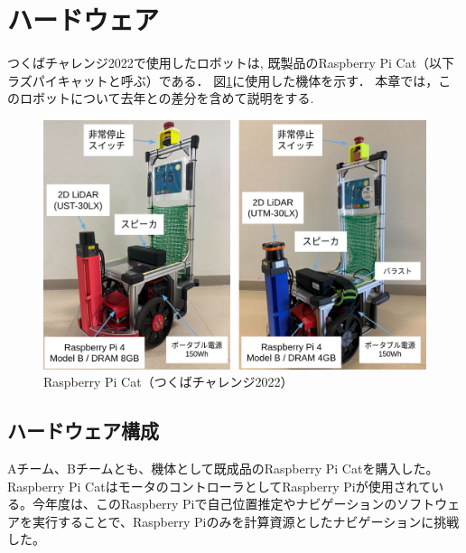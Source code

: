 \documentclass[twocolumn,9pt]{jsproceedings}
\begin{document}

\section{ハードウェア}

つくばチャレンジ2022で使用したロボットは, 
既製品のRaspberry Pi Cat（以下ラズパイキャットと呼ぶ）\cite{RTshop}である．
図\ref{fig:raspicat}に使用した機体を示す．
本章では，このロボットについて去年との差分を含めて説明をする.

\begin{figure}[h]
	\begin{center}
		\includegraphics[width=1.0\linewidth]{figs/raspicat.pdf}
		\caption{Raspberry Pi Cat（つくばチャレンジ2022）}
		\label{fig:raspicat}
	\end{center}
\end{figure}

\subsection{ハードウェア構成}


Aチーム、Bチームとも、機体として既成品のRaspberry Pi Catを購入した。Raspberry Pi CatはモータのコントローラとしてRaspberry Piが使用されている。今年度は、このRaspberry Piで自己位置推定やナビゲーションのソフトウェアを実行することで、Raspberry Piのみを計算資源としたナビゲーションに挑戦した。
\end{document}
